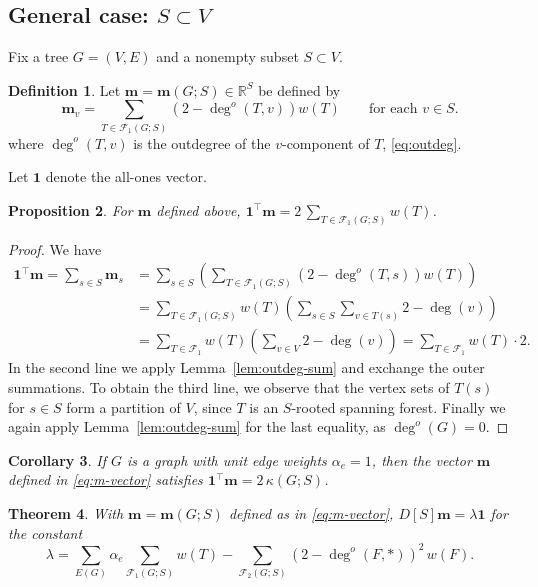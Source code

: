 \documentclass{amsart}
\newtheorem{thm}{Theorem}
\newtheorem{prop}[thm]{Proposition}
\newtheorem{cor}[thm]{Corollary}
\theoremstyle{definition}
\newtheorem{dfn}[thm]{Definition}
\newcommand{\RR}{\mathbb{R}}
\newcommand{\bone}{\mathbf{1}}
\newcommand{\boldm}{\mathbf{m}}
\newcommand{\tr}{\intercal}
\newcommand{\trees}{\mathcal{F}_1}
\newcommand{\forests}{\mathcal{F}}
\newcommand{\degout}{\deg^o}
\begin{document}
\subsection{General case: $S \subset V$}
Fix a tree $G = (V,E)$ and a nonempty subset $S \subset V$.
\begin{dfn}
\label{dfn:m-vector}
Let $\boldm = \boldm(G;S) \in \RR^S$ be defined by
\begin{equation}
\label{eq:m-vector}
\boldm_v =  \sum_{T \in \trees(G;S)} (2 - \degout(T,v)) w(T)
\qquad\text{for each }v \in S.
\end{equation}
where $\degout(T,v)$ is the outdegree of the $v$-component of $T$, \eqref{eq:outdeg}.
\end{dfn}

Let $\bone$ denote the all-ones vector.
\begin{prop}
For $\boldm$ defined above, $\displaystyle \bone^\tr \boldm = 2 \,\sum_{T \in \trees(G;S)} w(T)$.
\end{prop}
\begin{proof}
We have
\begin{align}
	\bone^\tr \boldm = \sum_{s\in S} \boldm_s &= \sum_{s \in S} \left( \sum_{T \in \trees(G;S)} (2 - \degout (T,s)) w(T) \right) \\
	&= \sum_{T \in \trees(G;S)} w(T) \left( \sum_{s\in S} \sum_{v \in T(s)} 2 - \deg(v) \right) \\
	&= \sum_{T \in \trees} w(T) \left( \sum_{v \in V} 2 - \deg(v)\right)
	= \sum_{T \in \trees} w(T) \cdot 2 .
\end{align}
In the second line we apply Lemma~\ref{lem:outdeg-sum} and exchange the outer summations.
To obtain the third line, we observe that the vertex sets of $T(s)$ for $s \in S$ form a partition of $V$, since $T$ is an $S$-rooted spanning forest. 
Finally we again apply Lemma~\ref{lem:outdeg-sum} for the last equality, as $\degout(G) = 0$.
\end{proof}

\begin{cor}
If $G$ is a graph with unit edge weights $\alpha_e = 1$, then the vector $\boldm$ defined in \eqref{eq:m-vector} satisfies $\bone^\tr \boldm = 2\, \kappa(G;S)$.
\end{cor}

\begin{thm}
With $\boldm = \boldm(G;S)$ defined as in \eqref{eq:m-vector},
$D[S] \boldm = \lambda \mathbf{1}$
for the constant
\begin{equation}
	\lambda = \sum_{E(G)} \alpha_e \sum_{\trees(G;S)} w(T) - \sum_{\forests_2(G;S)} (2 - \degout(F,*) )^2 \, w(F) .
\end{equation}
\end{thm}
\end{document}
